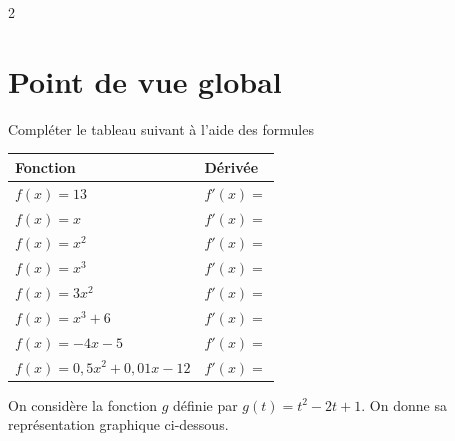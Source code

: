 \documentclass[10pt,a4paper]{article}
\begin{document}
\begin{multicols}{2}

    \section{Point de vue global}

    \begin{exo}[][]
         Compléter le tableau suivant à l'aide des formules 
         
         \begin{tabular}{|*{2}{p{}|}}
            \hline
            Fonction & Dérivée \\ \hline
            \(f(x) = 13\) & \(f'(x) = \) \\ \hline
            \(f(x) = x\) & \(f'(x) = \) \\ \hline
            \(f(x) = x^2\) & \(f'(x) = \) \\ \hline
            \(f(x) = x^3\) & \(f'(x) = \) \\ \hline
            \(f(x) = 3x^2\) & \(f'(x) = \) \\ \hline
            \(f(x) = x^3+6\) & \(f'(x) = \) \\ \hline
            \(f(x) = -4x-5\) & \(f'(x) = \) \\ \hline
            \(f(x) = 0,5x^2+0,01x-12\) & \(f'(x) = \) \\ \hline
         \end{tabular}
    \end{exo}

        \begin{exo}[][]
         On considère la fonction \(g\) définie par \(g(t) = t^2-2t+1\). On donne sa représentation graphique ci-dessous.

\end{exo}
\end{multicols}
\end{document}
